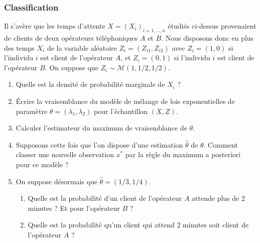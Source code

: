 \subsubsection{Classification}
Il s’avère que les temps d’attente $X = (X_i)_{i=1,\dots,n}$ étudiés ci-dessus provenaient de clients de deux opérateurs téléphoniques $A$ et $B$. Nous disposons donc en plus des temps $X_i$ de la variable aléatoire $Z_i=(Z_{i1},Z_{i2})$ avec $Z_i=(1, 0)$ si l’individu $i$ est client de l’opérateur $A$, et $Z_i=(0, 1)$ si l’individu $i$ est client de l’opérateur $B$. On suppose que $Z_i \sim \mathcal{M}(1, 1/2, 1/2)$.

\begin{enumerate}
	\item Quelle est la densité de probabilité marginale de $X_i$ ?
	\item Écrire la vraisemblance du modèle de mélange de lois exponentielles de paramètre $\theta=(\lambda_1,\lambda_2)$ pour l’échantillon $(\underline{X}, \underline{Z})$.
	\item Calculer l’estimateur du maximum de vraisemblance de $\theta$.
	\item Supposons cette fois que l’on dispose d’une estimation $\hat{\theta}$ de $\theta$. Comment classer une nouvelle observation $x^*$ par la règle du maximum a posteriori pour ce modèle ?
	\item On suppose désormais que $\hat{\theta}=(1/3, 1/4)$.
	\begin{enumerate}[label=(\alph*)]
		\item Quelle est la probabilité d’un client de l’opérateur $A$ attende plus de 2 minutes ? Et pour l’opérateur $B$ ?
		\item Quelle est la probabilité qu’un client qui attend 2 minutes soit client de l’opérateur $A$ ?
	\end{enumerate}
\end{enumerate}
